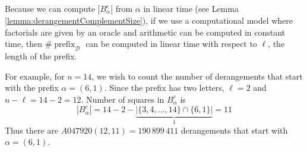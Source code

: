 Because we can compute $|B_\alpha^c|$ from $\alpha$ in linear time
(see Lemma \ref{lemma:derangementComplementSize}), if we use a computational
model where factorials are given by an oracle and arithmetic can be computed
in constant time, then $\#\operatorname{prefix}_\mathcal{D}$ can be computed
in linear time with respect to $\ell$, the length of the prefix.

\begin{example}
  For example, for $n = 14$, we wish to count the number of derangements that
  start with the prefix $\alpha = (6,1)$.
  Since the prefix has two letters, $\ell = 2$ and $n - \ell = 14 - 2 = 12$.
  Number of squares in $B_\alpha^c$ is \begin{equation}
    |B_\alpha^c| = 14 - 2 - \underbrace{|\{3,4,\dots,14\} \cap \{6, 1\}|}_1 = 11
  \end{equation}
  Thus there are $A047920(12,11) = 190\,899\,411$ derangements that start
  with $\alpha = (6,1)$.
\end{example}

